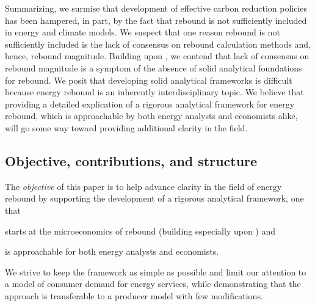 \documentclass[12pt]{article}\usepackage[]{graphicx}\usepackage[]{xcolor}
\begin{document}
Summarizing,
we surmise that development of 
effective carbon reduction policies has been hampered, in part,
by the fact that rebound is not sufficiently included in energy and climate models.
We suspect that one reason rebound is not sufficiently included
is the lack of consensus on rebound calculation methods and, hence, rebound magnitude.
Building upon \citet{Turner:2013aa}, 
we contend that lack of consensus on rebound magnitude
is a symptom of the absence of solid analytical foundations for rebound.
We posit that developing solid analytical frameworks 
is difficult because energy rebound is an inherently interdisciplinary topic.
We believe that providing a detailed explication of a rigorous analytical framework
for energy rebound,
which is approachable by both energy analysts and economists alike,
will go some way toward providing additional clarity in the field.


\subsection{Objective, contributions, and structure}
\label{sec:objective_contributions_structure}

The \emph{objective} of this paper is to help advance
clarity in the field of energy rebound by
supporting the development of a rigorous analytical framework, 
one that
%
\begin{enumerate*}[label={(\roman*)}]

  \item starts at the microeconomics of rebound
        (building especially upon \citet{Borenstein:2015aa}) and 
        
  \item is approachable for both energy analysts and economists.

\end{enumerate*}
%
We strive to keep the framework as simple as possible and limit our
attention to a model of consumer demand for energy services, 
while demonstrating that
the approach is transferable to a producer model with few modifications.
\end{document}
